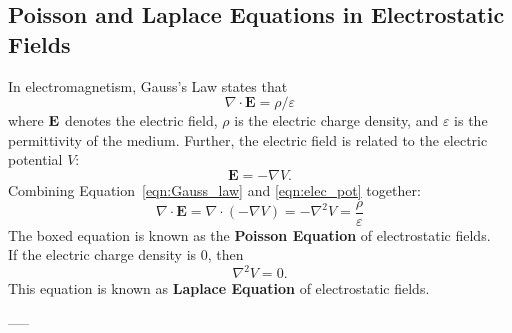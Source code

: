 \documentclass[a4paper, 12pt]{article}
\begin{document}
\subsection*{Poisson and Laplace Equations in Electrostatic Fields}

In electromagnetism, Gauss's Law states that
\begin{equation}
\label{eqn:Gauss_law}
    \nabla \cdot \mathbf{E} = \rho / \varepsilon
\end{equation}
where $\bf E$ denotes the electric field, $\rho$ is the electric charge density, and $\varepsilon$ is the permittivity of the medium. Further, the electric field is related to the electric potential $V$:
\begin{equation}
\label{eqn:elec_pot}
    \mathbf{E} = -\nabla V.
\end{equation}
Combining Equation~\ref{eqn:Gauss_law} and \ref{eqn:elec_pot} together:
\begin{equation}
    \nabla\cdot \mathbf{E} = \nabla \cdot (-\nabla V) = \boxed{-\nabla^{2} V = \frac{\rho}{\varepsilon} }
\end{equation}
The boxed equation is known as the \textbf{Poisson Equation} of electrostatic fields.\\

If the electric charge density is 0, then 
\begin{equation}
   \nabla^{2} V = 0 .
\end{equation}
This equation is known as \textbf{Laplace Equation} of electrostatic fields.

-----
\end{document}
